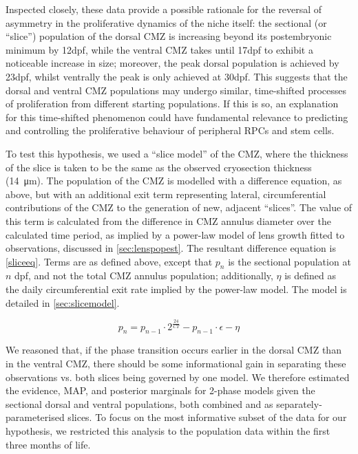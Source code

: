 \documentclass{ut-thesis}
\begin{document}
\begin{NoHyper}
Inspected closely, these data provide a possible rationale for the reversal of asymmetry in the proliferative dynamics of the niche itself: the sectional (or ``slice'') population of the dorsal CMZ is increasing beyond its postembryonic minimum by 12dpf, while the ventral CMZ takes until 17dpf to exhibit a noticeable increase in size; moreover, the peak dorsal population is achieved by 23dpf, whilst ventrally the peak is only achieved at 30dpf. This suggests that the dorsal and ventral CMZ populations may undergo similar, time-shifted processes of proliferation from different starting populations. If this is so, an explanation for this time-shifted phenomenon could have fundamental relevance to predicting and controlling the proliferative behaviour of peripheral RPCs and stem cells.

To test this hypothesis, we used a ``slice model'' of the CMZ, where the thickness of the slice is taken to be the same as the observed cryosection thickness (\SI{14}{\micro\metre}). The population of the CMZ is modelled with a difference equation, as above, but with an additional exit term representing lateral, circumferential contributions of the CMZ to the generation of new, adjacent ``slices''. The value of this term is calculated from the difference in CMZ annulus diameter over the calculated time period, as implied by a power-law model of lens growth fitted to observations, discussed in \autoref{sec:lenspopest}. The resultant difference equation is \autoref{sliceeq}. Terms are as defined above, except that $p_n$ is the sectional population at $n$ dpf, and not the total CMZ annulus population; additionally, $\eta$ is defined as the daily circumferential exit rate implied by the power-law model. The model is detailed in \autoref{sec:slicemodel}.

\begin{equation}
    p_n=p_{n-1} \cdot 2^{\frac{24}{CT}} - p_{n-1} \cdot \epsilon - \eta
    \label{sliceeq}
\end{equation}

We reasoned that, if the phase transition occurs earlier in the dorsal CMZ than in the ventral CMZ, there should be some informational gain in separating these observations vs. both slices being governed by one model. We therefore estimated the evidence, MAP, and posterior marginals for 2-phase models given the sectional dorsal and ventral populations, both combined and as separately-parameterised slices. To focus on the most informative subset of the data for our hypothesis, we restricted this analysis to the population data within the first three months of life.


\end{NoHyper}
\end{document}
